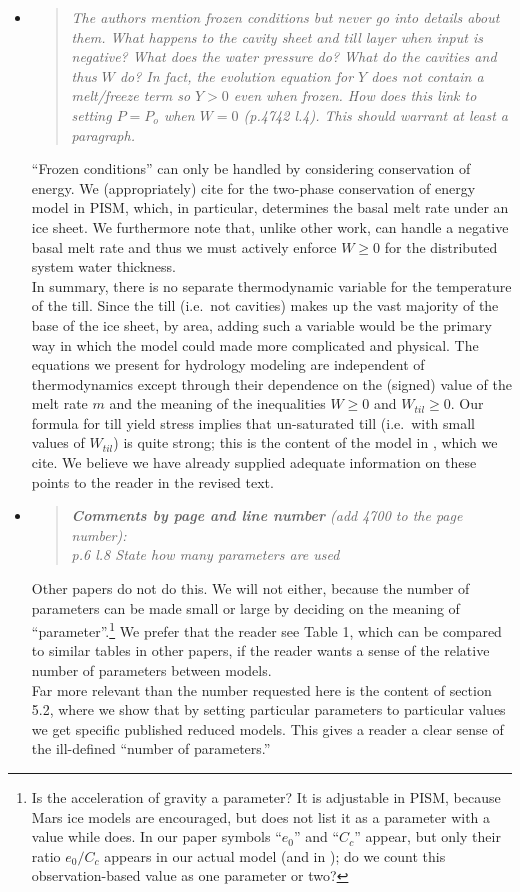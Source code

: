 \documentclass[11pt,reqno]{amsart}
\newcommand{\reply}[2]{
\medskip\medskip
\item  \begin{quote}
\emph{#1}
\end{quote}

\medskip
\noindent #2}
\begin{document}
\begin{itemize}
\reply{The authors mention frozen conditions but never go into details about them.  What
happens to the cavity sheet and till layer when input is negative?  What does the water
pressure do?  What do the cavities and thus $W$ do?  In fact, the evolution equation for
$Y$ does not contain a melt/freeze term so $Y > 0$ even when frozen.  How does this link
to setting $P = P_o$ when $W = 0$ (p.4742 l.4).  This should warrant at least a paragraph.}
{``Frozen conditions'' can only be handled by considering conservation of energy.  We (appropriately) cite \cite{AschwandenBuelerKhroulevBlatter} for the two-phase conservation of energy model in PISM, which, in particular, determines the basal melt rate under an ice sheet.  We furthermore note that, unlike other work, can handle a negative basal melt rate and thus we must actively enforce $W\ge 0$ for the distributed system water thickness.  \\
\indent In summary, there is no separate thermodynamic variable for the temperature of the till.  Since the till (i.e.~not cavities) makes up the vast majority of the base of the ice sheet, by area, adding such a variable would be the primary way in which the model could made more complicated and physical.  The equations we present for hydrology modeling are independent of thermodynamics except through their dependence on the (signed) value of the melt rate $m$ and the meaning of the inequalities $W\ge 0$ and $W_{til}\ge 0$.  Our formula for till yield stress implies that un-saturated till (i.e.~with small values of $W_{til}$) is quite strong; this is the content of the model in \cite{Tulaczyketal2000}, which we cite.  We believe we have already supplied adequate information on these points to the reader in the revised text.}

\reply{\textbf{Comments by page and line number} (add 4700 to the page number):\\
\indent p.6 l.8 State how many parameters are used}
{Other papers do not do this.  We will not either, because the number of parameters can be made small or large by deciding on the meaning of ``parameter''.\footnote{Is the acceleration of gravity a parameter?  It is adjustable in PISM, because Mars ice models are encouraged, but \cite{deFleurianetal2014} does not list it as a parameter with a value while \cite{Werderetal2013} does.  In our paper symbols ``$e_0$'' and ``$C_c$'' appear, but only their ratio $e_0/C_c$ appears in our actual model (and in \cite{Tulaczyketal2000}); do we count this observation-based value as one parameter or two?}  We prefer that the reader see Table 1, which can be compared to similar tables in other papers, if the reader wants a sense of the relative number of parameters between models.\\
\indent Far more relevant than the number requested here is the content of section 5.2, where we show that by setting particular parameters to particular values we get specific published reduced models.  This gives a reader a clear sense of the ill-defined ``number of parameters.''}


\end{itemize}
\end{document}
